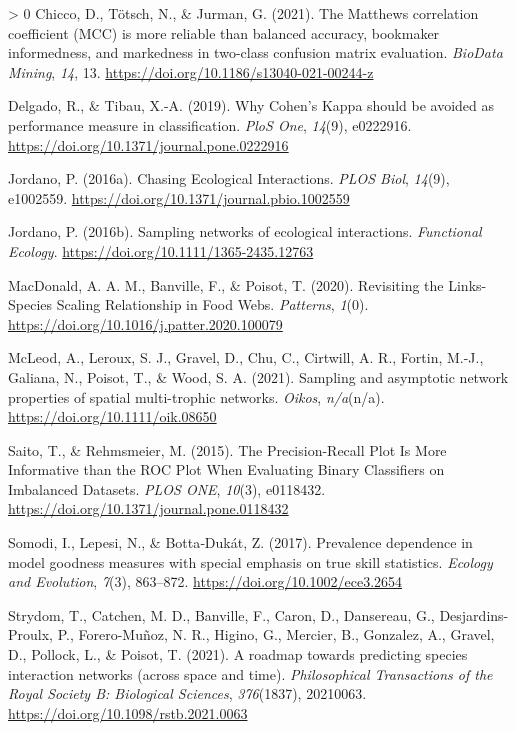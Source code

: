 \documentclass[10pt,oneside]{article}
\newlength{\cslhangindent}
\newenvironment{CSLReferences}[3] %
 {%
  \setlength{\parindent}{0pt}
  \ifodd #1 \everypar{\setlength{\hangindent}{\cslhangindent}}\ignorespaces\fi
  \ifnum #2 > 0
  \setlength{\parskip}{#2\baselineskip}
  \fi
 }%
 {}
\begin{document}
\begin{CSLReferences}{1}{0}
\leavevmode\hypertarget{ref-Chicco2021MatCor}{}%
Chicco, D., Tötsch, N., \& Jurman, G. (2021). The Matthews correlation
coefficient (MCC) is more reliable than balanced accuracy, bookmaker
informedness, and markedness in two-class confusion matrix evaluation.
\emph{BioData Mining}, \emph{14}, 13.
\url{https://doi.org/10.1186/s13040-021-00244-z}

\leavevmode\hypertarget{ref-Delgado2019WhyCoh}{}%
Delgado, R., \& Tibau, X.-A. (2019). Why Cohen's Kappa should be avoided
as performance measure in classification. \emph{PloS One}, \emph{14}(9),
e0222916. \url{https://doi.org/10.1371/journal.pone.0222916}

\leavevmode\hypertarget{ref-Jordano2016ChaEco}{}%
Jordano, P. (2016a). Chasing Ecological Interactions. \emph{PLOS Biol},
\emph{14}(9), e1002559.
\url{https://doi.org/10.1371/journal.pbio.1002559}

\leavevmode\hypertarget{ref-Jordano2016SamNet}{}%
Jordano, P. (2016b). Sampling networks of ecological interactions.
\emph{Functional Ecology}. \url{https://doi.org/10.1111/1365-2435.12763}

\leavevmode\hypertarget{ref-MacDonald2020RevLin}{}%
MacDonald, A. A. M., Banville, F., \& Poisot, T. (2020). Revisiting the
Links-Species Scaling Relationship in Food Webs. \emph{Patterns},
\emph{1}(0). \url{https://doi.org/10.1016/j.patter.2020.100079}

\leavevmode\hypertarget{ref-McLeod2021SamAsy}{}%
McLeod, A., Leroux, S. J., Gravel, D., Chu, C., Cirtwill, A. R., Fortin,
M.-J., Galiana, N., Poisot, T., \& Wood, S. A. (2021). Sampling and
asymptotic network properties of spatial multi-trophic networks.
\emph{Oikos}, \emph{n/a}(n/a). \url{https://doi.org/10.1111/oik.08650}

\leavevmode\hypertarget{ref-Saito2015PrePlo}{}%
Saito, T., \& Rehmsmeier, M. (2015). The Precision-Recall Plot Is More
Informative than the ROC Plot When Evaluating Binary Classifiers on
Imbalanced Datasets. \emph{PLOS ONE}, \emph{10}(3), e0118432.
\url{https://doi.org/10.1371/journal.pone.0118432}

\leavevmode\hypertarget{ref-Somodi2017PreDep}{}%
Somodi, I., Lepesi, N., \& Botta‐Dukát, Z. (2017). Prevalence dependence
in model goodness measures with special emphasis on true skill
statistics. \emph{Ecology and Evolution}, \emph{7}(3), 863--872.
\url{https://doi.org/10.1002/ece3.2654}

\leavevmode\hypertarget{ref-Strydom2021RoaPre}{}%
Strydom, T., Catchen, M. D., Banville, F., Caron, D., Dansereau, G.,
Desjardins-Proulx, P., Forero-Muñoz, N. R., Higino, G., Mercier, B.,
Gonzalez, A., Gravel, D., Pollock, L., \& Poisot, T. (2021). A roadmap
towards predicting species interaction networks (across space and time).
\emph{Philosophical Transactions of the Royal Society B: Biological
Sciences}, \emph{376}(1837), 20210063.
\url{https://doi.org/10.1098/rstb.2021.0063}


\end{CSLReferences}
\end{document}
